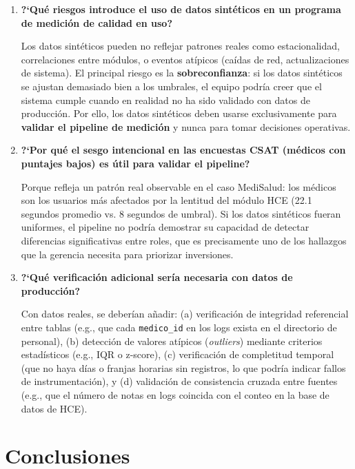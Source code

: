 \documentclass[12pt,a4paper]{article}
\begin{document}
\begin{enumerate}
    \item \textbf{?`Qu\'e riesgos introduce el uso de datos sint\'eticos en un programa de medici\'on de calidad en uso?}

    Los datos sint\'eticos pueden no reflejar patrones reales como estacionalidad, correlaciones entre m\'odulos, o eventos at\'ipicos (ca\'idas de red, actualizaciones de sistema). El principal riesgo es la \textbf{sobreconfianza}: si los datos sint\'eticos se ajustan demasiado bien a los umbrales, el equipo podr\'ia creer que el sistema cumple cuando en realidad no ha sido validado con datos de producci\'on. Por ello, los datos sint\'eticos deben usarse exclusivamente para \textbf{validar el pipeline de medici\'on} y nunca para tomar decisiones operativas.

    \item \textbf{?`Por qu\'e el sesgo intencional en las encuestas CSAT (m\'edicos con puntajes bajos) es \'util para validar el pipeline?}

    Porque refleja un patr\'on real observable en el caso MediSalud: los m\'edicos son los usuarios m\'as afectados por la lentitud del m\'odulo HCE (22.1 segundos promedio vs. 8 segundos de umbral). Si los datos sint\'eticos fueran uniformes, el pipeline no podr\'ia demostrar su capacidad de detectar diferencias significativas entre roles, que es precisamente uno de los hallazgos que la gerencia necesita para priorizar inversiones.

    \item \textbf{?`Qu\'e verificaci\'on adicional ser\'ia necesaria con datos de producci\'on?}

    Con datos reales, se deber\'ian a\~nadir: (a) verificaci\'on de integridad referencial entre tablas (e.g., que cada \texttt{medico\_id} en los logs exista en el directorio de personal), (b) detecci\'on de valores at\'ipicos (\textit{outliers}) mediante criterios estad\'isticos (e.g., IQR o z-score), (c) verificaci\'on de completitud temporal (que no haya d\'ias o franjas horarias sin registros, lo que podr\'ia indicar fallos de instrumentaci\'on), y (d) validaci\'on de consistencia cruzada entre fuentes (e.g., que el n\'umero de notas en logs coincida con el conteo en la base de datos de HCE).
\end{enumerate}

\section{Conclusiones}
\end{document}
